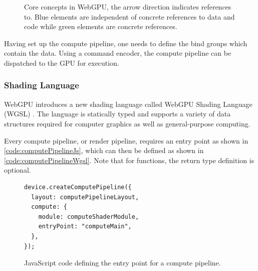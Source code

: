 \begin{figure}[H]
  \centering
  \caption{Core concepts in WebGPU, the arrow direction indicates references to. Blue elements are independent of concrete references to data and code while green elements are concrete references.}
  \label{fig:webgpu-arch}
\end{figure}

Having set up the compute pipeline, one needs to define the bind groups which contain the data. Using a command encoder, the compute pipeline can be dispatched to the \gls{GPU} for execution.

\subsubsection{Shading Language}

\gls{WebGPU} introduces a new shading language called \gls{WebGPU} Shading Language (\gls{WGSL}) \cite{wgslSpecification}. The language is statically typed and supports a variety of data structures required for computer graphics as well as general-purpose computing.

Every compute pipeline, or render pipeline, requires an entry point as shown in \autoref{code:computePipelineJs}, which can then be defined as shown in \autoref{code:computePipelineWgsl}. Note that for functions, the return type definition is optional.

\begin{figure}[H]
  \begin{lstlisting}[style=JavaScript]
device.createComputePipeline({
  layout: computePipelineLayout,
  compute: {
    module: computeShaderModule,
    entryPoint: "computeMain",
  },
});
  \end{lstlisting}
  \caption{JavaScript code defining the entry point for a compute pipeline.}
  \label{code:computePipelineJs}
\end{figure}

